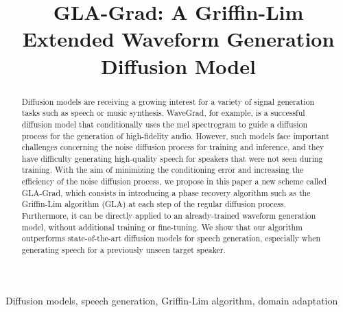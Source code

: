 \documentclass{article}
\title{GLA-Grad: A Griffin-Lim Extended Waveform Generation Diffusion Model}
\begin{document}
\ninept
\maketitle


\begin{abstract}
Diffusion models are receiving a growing interest for a variety of signal generation tasks such as speech or music synthesis. WaveGrad, for example, is a successful diffusion model that conditionally uses the mel spectrogram to guide a diffusion process for the generation of high-fidelity audio.  However, such models face important challenges concerning the noise diffusion process for training and inference, and they have difficulty generating high-quality speech for speakers that were not seen during training.  %
With the aim of minimizing the conditioning error and increasing the efficiency of the noise diffusion process, we propose in this paper a new scheme called GLA-Grad, which consists in introducing a phase recovery algorithm such as the Griffin-Lim algorithm (GLA) at each step of the regular diffusion process.  Furthermore, it can be directly applied to an already-trained waveform generation model, without additional training or fine-tuning. We show that our algorithm outperforms state-of-the-art diffusion models for speech generation, especially when generating speech for a previously unseen target speaker.
\end{abstract}
%
\begin{keywords}
Diffusion models, speech generation, Griffin-Lim algorithm, domain adaptation
\end{keywords}












\balance


\end{document}
